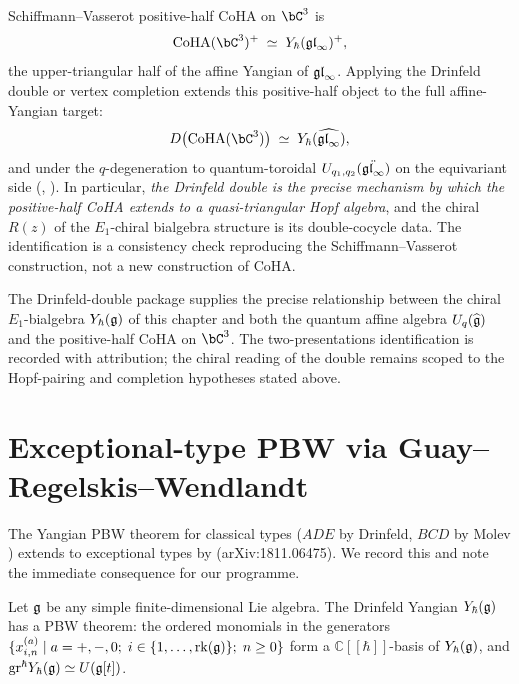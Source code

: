 \begin{remark}
\begin{enumerate}
Schiffmann--Vasserot positive-half CoHA on $\bC^3$ is
\cite{SchiffmannVasserot13}
\[
 \mathrm{CoHA}(\bC^{3})^{+} \;\simeq\; \Yhbar(\fgl_{\infty})^{+},
\]
the upper-triangular half of the affine Yangian of $\mathfrak{gl}_{\infty}$.
Applying the Drinfeld double or vertex completion extends this
positive-half object to the full affine-Yangian target:
\[
 D\bigl(\mathrm{CoHA}(\bC^{3})\bigr)
 \;\simeq\; \Yhbar(\widehat{\fgl_{\infty}}),
\]
and under the $q$-degeneration to quantum-toroidal
$U_{q_1,q_2}(\ddot{\mathfrak{gl}_{\infty}})$ on the equivariant side
(\cite{FeiginJimboMiwaMukhin11}, \cite{SchiffmannVasserot13}). In
particular, \emph{the Drinfeld double is the precise mechanism by which
the positive-half CoHA extends to a quasi-triangular Hopf algebra}, and
the chiral $R(z)$ of the $E_1$-chiral bialgebra structure is its
double-cocycle data. The identification is a consistency check
reproducing the Schiffmann--Vasserot construction, not a new
construction of CoHA.
\end{enumerate}
The Drinfeld-double package supplies the precise relationship between
the chiral $E_1$-bialgebra
$Y_{\hbar}(\mathfrak{g})$ of this chapter and both the quantum affine algebra
$U_q(\widehat{\mathfrak{g}})$ and the positive-half CoHA on $\bC^{3}$.
The two-presentations identification is recorded with attribution; the
chiral reading of the double remains scoped to the Hopf-pairing and
completion hypotheses stated above.
\end{remark}

\section{Exceptional-type PBW via Guay--Regelskis--Wendlandt}
\label{sec:exceptional-PBW}

The Yangian PBW theorem for classical types
($ADE$ by Drinfeld, $BCD$ by Molev \cite{Molev07}) extends to
exceptional types by \cite{GuayRegelskisWendlandt18}
(arXiv:1811.06475). We record this and note the immediate consequence
for our programme.

\begin{theorem}
\label{thm:exceptional-PBW}
\ClaimStatusProvedElsewhere
Let $\mathfrak{g}$ be any simple finite-dimensional Lie algebra. The Drinfeld
Yangian $Y_{\hbar}(\mathfrak{g})$ has a PBW theorem: the ordered monomials in the
generators $\{x^{(a)}_{i,n}\mid a = +, -, 0;\; i\in \{1, \ldots,
\mathrm{rk}(\mathfrak{g})\};\; n\ge 0\}$ form a $\mathbb{C}[\![\hbar]\!]$-basis
of $Y_{\hbar}(\mathfrak{g})$, and
$\mathrm{gr}^{\hbar}Y_{\hbar}(\mathfrak{g}) \simeq U(\mathfrak{g}[t])$.
\end{theorem}

